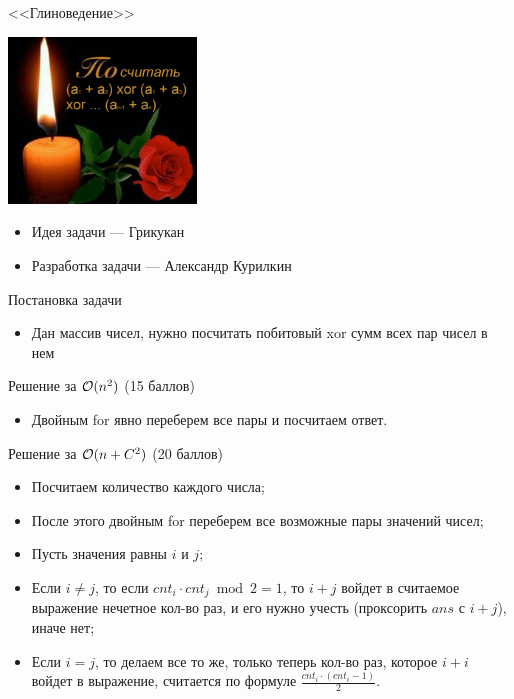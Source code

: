 \begin{frame}
  \begin{center}
    \LARGE <<Глиноведение>>
  \end{center}
  
  \begin{center}
      \includegraphics[width=5cm]{e-meme.png}
  \end{center}

  \begin{itemize}
  \item Идея задачи --- Грикукан
  \item Разработка задачи --- Александр Курилкин
  \end{itemize}

\end{frame}

\begin{frame}{Постановка задачи}

  \begin{itemize}
  \item Дан массив чисел, нужно посчитать побитовый xor сумм всех пар чисел в нем
  \end{itemize}

\end{frame}

\begin{frame}{Решение за $\mathcal{O}(n^2)$ (15 баллов)}
  \begin{itemize}
  \item Двойным for явно переберем все пары и посчитаем ответ.
  \end{itemize}
\end{frame}

\begin{frame}{Решение за $\mathcal{O}(n + C^2)$ (20 баллов)}
  \begin{itemize}
  \item Посчитаем количество каждого числа;
  \item После этого двойным for переберем все возможные пары значений чисел;
  \item Пусть значения равны $i$ и $j$;
  \item Если $i \neq j$, то если $cnt_i \cdot cnt_j \bmod 2 = 1$, то $i + j$ войдет в считаемое выражение нечетное кол-во раз, и его нужно учесть (проксорить $ans$ с $i + j$), иначе нет;
  \item Если $i = j$, то делаем все то же, только теперь кол-во раз, которое $i + i$ войдет в выражение, считается по формуле $\frac{cnt_i \cdot (cnt_{i} - 1)}{2}$.
  \end{itemize}
\end{frame}

